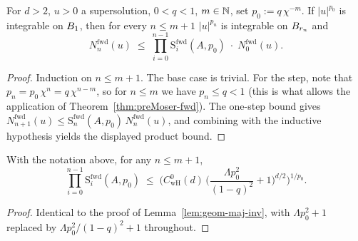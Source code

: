 \begin{theorem}
\label{thm:iter-fwd}
\leanok
{}
For $d>2$, $u>0$ a supersolution, $0<q<1$, $m \in \mathbb{N}$, set $p_0 := q\,\chi^{-m}$.
If $|u|^{p_0}$ is integrable on $B_{1}$, then for every $n \leq m+1$
$|u|^{p_n}$ is integrable on $B_{r_n}$ and
\begin{equation*}
  N_n^{\mathrm{fwd}}(u)
  \;\leq\;
  \prod_{i=0}^{n-1} \mathrm{S}_i^{\mathrm{fwd}}(A,p_0)\;\cdot\;
  N_0^{\mathrm{fwd}}(u).
\end{equation*}
\end{theorem}

\begin{proof}
\leanok
{}

Induction on $n \leq m+1$. The base case is trivial. For the step, note that
$p_n = p_0\,\chi^{n} = q\,\chi^{n-m}$, so for $n \leq m$ we have $p_n \leq q < 1$
(this is what allows the application of Theorem~\ref{thm:preMoser-fwd}). The
one-step bound gives $N_{n+1}^{\mathrm{fwd}}(u) \leq
\mathrm{S}_n^{\mathrm{fwd}}(A,p_0)\,N_n^{\mathrm{fwd}}(u)$, and combining with
the inductive hypothesis yields the displayed product bound.
\end{proof}

\begin{lemma}
\label{lem:geom-maj-fwd}
\leanok
{}
With the notation above, for any $n \leq m+1$,
\begin{equation*}
  \prod_{i=0}^{n-1}\mathrm{S}_i^{\mathrm{fwd}}(A,p_0)
  \;\leq\;
  \Big(C_{\mathrm{wH}}^{0}(d)\,
    \Big(\frac{\Lambda p_0^{2}}{(1-q)^{2}}+1\Big)^{d/2}\Big)^{1/p_0}.
\end{equation*}
\end{lemma}

\begin{proof}
\leanok
{}

Identical to the proof of Lemma~\ref{lem:geom-maj-inv}, with $\Lambda p_0^{2}+1$
replaced by $\Lambda p_0^{2}/(1-q)^{2}+1$ throughout.
\end{proof}

